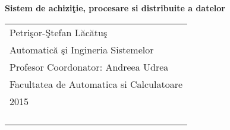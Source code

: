 \documentclass[a4paper,12pt]{book}
\begin{document}
\pagestyle{empty}    
\begingroup
{}


\begin{titlepage}
\vspace*{144pt}
\begin{center}
\Huge\bf Sistem de achiziţie, procesare si distribuite a datelor %
\end{center}
\enlargethispage{3cm}
\vfill

\hfill
\begin{tabular}[t]{l@{}}%
Petrişor-Ştefan Lăcătuş\\ %
Automatică şi Ingineria Sistemelor\\ %
Profesor Coordonator: Andreea Udrea\\ %
Facultatea de Automatica si Calculatoare\\ %
2015\\ %
\\
\\
\\
\\
\end{tabular}
\end{titlepage}


\tableofcontents 

\endgroup %

\clearpage
\pagestyle{plain}      


 

 

 

\printbibliography[title={Bibliografie}] %
\end{document}
